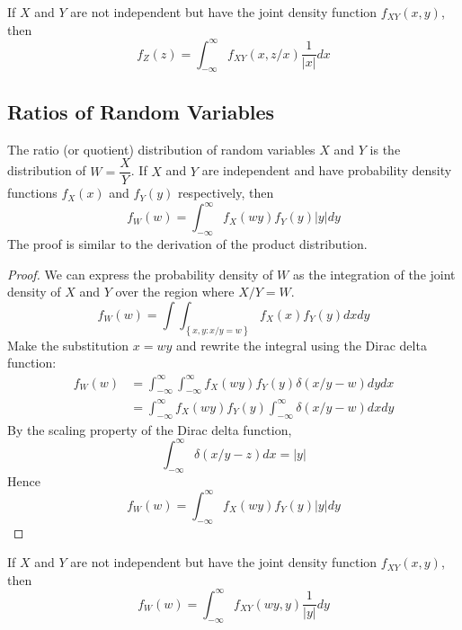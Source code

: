 \documentclass[11pt]{report} %
\begin{document}
If $X$ and $Y$ are not independent but have the joint density function $f_{XY}\left(x, y\right)$, then
\begin{equation}
f_{Z}\left(z\right) = \int_{-\infty}^{\infty}f_{XY}\left(x, z/x\right)\dfrac{1}{\left|x\right|}dx
\end{equation}

\subsection{Ratios of Random Variables}
The ratio (or quotient) distribution of random variables $X$ and $Y$ is the distribution of $W = \dfrac{X}{Y}$. If $X$ and $Y$ are independent and have probability density functions $f_{X}\left(x\right)$ and $f_{Y}\left(y\right)$ respectively, then
\begin{equation}
f_{W}\left(w\right) = \int_{-\infty}^{\infty}f_{X}\left(wy\right)f_{Y}\left(y\right)\left|y\right|dy
\end{equation}
The proof is similar to the derivation of the product distribution.
\begin{proof}
We can express the probability density of $W$ as the integration of the joint density of $X$ and $Y$ over the region where $X/Y = W$.
\begin{equation}
f_{W}\left(w\right) = \int\int_{\left\{x, y: x/y = w\right\}}f_{X}\left(x\right)f_{Y}\left(y\right)dxdy
\end{equation}
Make the substitution $x = wy$ and rewrite the integral using the Dirac delta function:
\begin{align}
f_{W}\left(w\right) &= \int_{-\infty}^{\infty}\int_{-\infty}^{\infty}f_{X}\left(wy\right)f_{Y}\left(y\right)\delta\left(x/y - w\right)dydx \\
&= \int_{-\infty}^{\infty}f_{X}\left(wy\right)f_{Y}\left(y\right)\int_{-\infty}^{\infty}\delta\left(x/y - w\right)dxdy
\end{align}
By the scaling property of the Dirac delta function,
\begin{equation}
\int_{-\infty}^{\infty}\delta\left(x/y - z\right)dx = \left|y\right|
\end{equation}
Hence
\begin{equation}
f_{W}\left(w\right) = \int_{-\infty}^{\infty}f_{X}\left(wy\right)f_{Y}\left(y\right)\left|y\right|dy
\end{equation}
\end{proof}
If $X$ and $Y$ are not independent but have the joint density function $f_{XY}\left(x, y\right)$, then
\begin{equation}
f_{W}\left(w\right) = \int_{-\infty}^{\infty}f_{XY}\left(wy, y\right)\dfrac{1}{\left|y\right|}dy
\end{equation}
\end{document}
